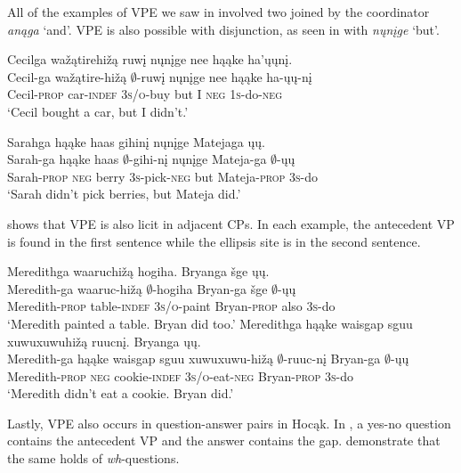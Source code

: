 \documentclass[output=paper]{LSP/langsci}
\begin{document}
All of the examples of VPE we saw in  involved two  joined by the coordinator \emph{anąga} `and'. VPE is also possible with disjunction, as seen in  with \emph{nųnįge} `but'.
 
\ea\label{ex:johnson:26}
\ea 
\glll Cecilga wažątirehižą ruwį nųnįge nee hąąke ha'ųųnį.\\
Cecil-ga wažątire-hižą $\emptyset$-ruwį nųnįge nee hąąke ha-ųų-nį\\
Cecil-\textsc{prop} car-\textsc{indef} \textsc{3s/o}-buy but I \textsc{neg} \textsc{1s}-do-\textsc{neg}\\
\trans `Cecil bought a car, but I didn't.'

\ex 
\glll Sarahga hąąke haas gihinį nųnįge Matejaga ųų.\\
Sarah-ga hąąke haas $\emptyset$-gihi-nį nųnįge Mateja-ga {\db}$\emptyset$-ųų\\
Sarah-\textsc{prop} \textsc{neg} berry \textsc{3s}-pick-\textsc{neg} but Mateja-\textsc{prop} {\db}\textsc{3s}-do\\
\trans `Sarah didn't pick berries, but Mateja did.'
\z
\z


 shows that VPE is also licit in adjacent CPs. In each example, the antecedent VP is found in the first sentence while the ellipsis site is in the second sentence.
 
\ea\label{ex:johnson:27}
\ea 
\glll Meredithga waaruchižą hogiha. Bryanga šge ųų.\\
Meredith-ga waaruc-hižą $\emptyset$-hogiha Bryan-ga šge {\db}$\emptyset$-ųų\\
Meredith-\textsc{prop} table-\textsc{indef} \textsc{3s/o}-paint Bryan-\textsc{prop} also {\db}\textsc{3s}-do\\
\trans `Meredith painted a table. Bryan did too.'
\ex 
\glll Meredithga hąąke {waisgap sguu xuwuxuwuhižą} ruucnį. Bryanga ųų.\\
Meredith-ga hąąke {waisgap sguu xuwuxuwu-hižą} $\emptyset$-ruuc-nį Bryan-ga {\db}$\emptyset$-ųų\\
Meredith-\textsc{prop} \textsc{neg} cookie-\textsc{indef} \textsc{3s/o}-eat-\textsc{neg} Bryan-\textsc{prop} {\db}\textsc{3s}-do\\
\trans `Meredith didn't eat a cookie. Bryan did.'
\z
\z

 
Lastly, VPE also occurs in question-answer pairs in Hocąk. In , a yes-no question contains the antecedent VP and the answer contains the gap.  demonstrate that the same holds of \emph{wh}-questions.
 
\end{document}
